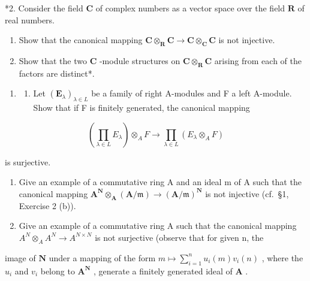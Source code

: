 *2. Consider the field \(\mathbf{C}\) of complex numbers as a vector space over the field \(\mathbf{R}\) of real numbers.

\begin{enumerate}
\def\labelenumi{(\alph{enumi})}
\item
  Show that the canonical mapping \(\mathbf{C} \otimes_{\mathbf{R}} \mathbf{C} \to \mathbf{C} \otimes_{\mathbf{C}} \mathbf{C}\) is not injective.
\item
  Show that the two \(\mathbf{C}\) -module structures on \(\mathbf{C} \otimes_{\mathbf{R}} \mathbf{C}\) arising from each of the factors are distinct*.
\end{enumerate}

\begin{enumerate}
\def\labelenumi{\arabic{enumi}.}
\setcounter{enumi}{2}
\tightlist
\item
  \begin{enumerate}
  \def\labelenumii{(\alph{enumii})}
  \tightlist
  \item
    Let \((\mathbf{E}_{\lambda})_{\lambda \in L}\) be a family of right A-modules and F a left A-module. Show that if F is finitely generated, the canonical mapping
  \end{enumerate}
\end{enumerate}

\[
\left(\prod_ {\lambda \in L} E _ {\lambda}\right) \otimes_ {A} F \rightarrow \prod_ {\lambda \in L} (E _ {\lambda} \otimes_ {A} F)
\]

is surjective.

\begin{enumerate}
\def\labelenumi{(\alph{enumi})}
\setcounter{enumi}{1}
\item
  Give an example of a commutative ring A and an ideal m of A such that the canonical mapping \(\mathbf{A}^{\mathbf{N}}\otimes_{\mathbf{A}}(\mathbf{A}/\mathfrak{m})\to(\mathbf{A}/\mathfrak{m})^{\mathbf{N}}\) is not injective (cf.~§1, Exercise 2 (b)).
\item
  Give an example of a commutative ring A such that the canonical mapping \(A^{N} \otimes_{A} A^{N} \to A^{N \times N}\) is not surjective (observe that for given n, the
\end{enumerate}

image of \(\mathbf{N}\) under a mapping of the form \(m \mapsto \sum_{i=1}^{n} u_i(m)v_i(n)\) , where the \(u_i\) and \(v_i\) belong to \(\mathbf{A}^{\mathbf{N}}\) , generate a finitely generated ideal of \(\mathbf{A}\) .

